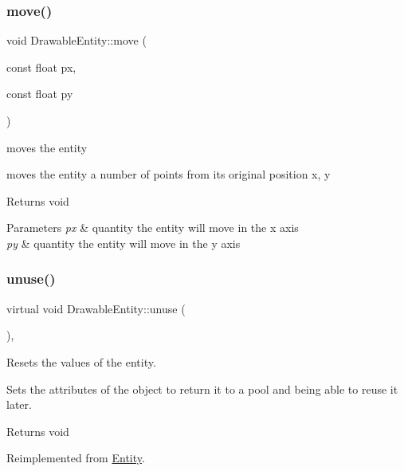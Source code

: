 \subsubsection{\texorpdfstring{move()}{move()}}
{\footnotesize\ttfamily void Drawable\+Entity\+::move (\begin{DoxyParamCaption}\item[{const float}]{px,  }\item[{const float}]{py }\end{DoxyParamCaption})}



moves the entity 

moves the entity a number of points from it\textquotesingle{}s original position x, y

\begin{DoxyReturn}{Returns}
void 
\end{DoxyReturn}

\begin{DoxyParams}{Parameters}
{\em px} & quantity the entity will move in the x axis \\
\hline
{\em py} & quantity the entity will move in the y axis \\
\hline
\end{DoxyParams}
\mbox{\label{class_drawable_entity_aabea8715834f6cee7fd36b038d1a4843}} 
\subsubsection{\texorpdfstring{unuse()}{unuse()}}
{\footnotesize\ttfamily virtual void Drawable\+Entity\+::unuse (\begin{DoxyParamCaption}{ }\end{DoxyParamCaption})\hspace{0.3cm}{\ttfamily [override]}, {\ttfamily [virtual]}}



Resets the values of the entity. 

Sets the attributes of the object to return it to a pool and being able to reuse it later.

\begin{DoxyReturn}{Returns}
void 
\end{DoxyReturn}


Reimplemented from \hyperlink{class_entity_a7b87e24b0d790b2c182fad8aa572455c}{Entity}.



